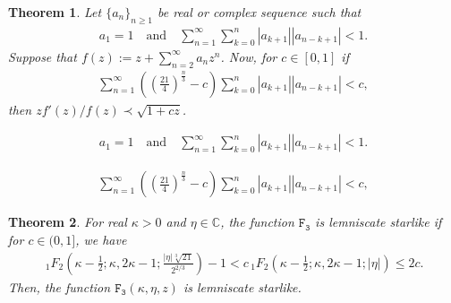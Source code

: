 \documentclass[10pt,a4paper]{amsart}
\newtheorem{theorem}{Theorem}
\begin{document}
\begin{theorem}\label{thm:anlytic-LS}
    Let $\{a_n\}_{n\ge 1}$ be real or complex sequence such that 
    \begin{align}\label{eqn:hypo-1-thm1}
a_1=1 \quad \text{and} \quad \sum_{n=1}^{\infty} \sum_{k=0}^n |a_{k+1}|  |a_{n-k+1}|<1.
\end{align}
Suppose that $f(z):= z+ \sum_{n=2}^{\infty} a_n z^n$. Now, for $c \in [0, 1]$ if
\begin{align}\label{eqn:hypo-thm1}
\sum_{n=1}^{\infty} \left( \left(\tfrac{21}{4}\right)^{\tfrac{n}{3}}- c\right) \sum_{k=0}^n  |a_{k+1}|  |a_{n-k+1}| < c, 
\end{align}
then $z f'(z)/ f(z)\prec \sqrt{1+ cz}$. 
\end{theorem}

    \begin{align}
a_1=1 \quad \text{and} \quad \sum_{n=1}^{\infty} \sum_{k=0}^n |a_{k+1}|  |a_{n-k+1}|<1.
\end{align}

\begin{align}
\sum_{n=1}^{\infty} \left( \left(\tfrac{21}{4}\right)^{\tfrac{n}{3}}- c\right) \sum_{k=0}^n  |a_{k+1}|  |a_{n-k+1}| < c, 
\end{align}

\begin{theorem}\label{thm-GBessel}
    For real $\kappa>0$ and $\eta \in \mathbb{C}$, the function $\mathtt{F_3}$ is lemniscate starlike if for $c \in (0, 1]$, we have
    \begin{align}\label{en:hypo-1-thm-Bessel}
       \, _1F_2\left(\kappa -\frac{1}{2};\kappa ,2 \kappa -1;\frac{|\eta|\sqrt[3]{21}}{2^{2/3}}\right)-1<c\, _1F_2\left(\kappa -\frac{1}{2};\kappa ,2 \kappa -1; |\eta|\right) \le 2 c.
    \end{align} 
    Then, the function $\mathtt{F_3}(\kappa, \eta, z)$ is lemniscate starlike. 
\end{theorem}
\end{document}
